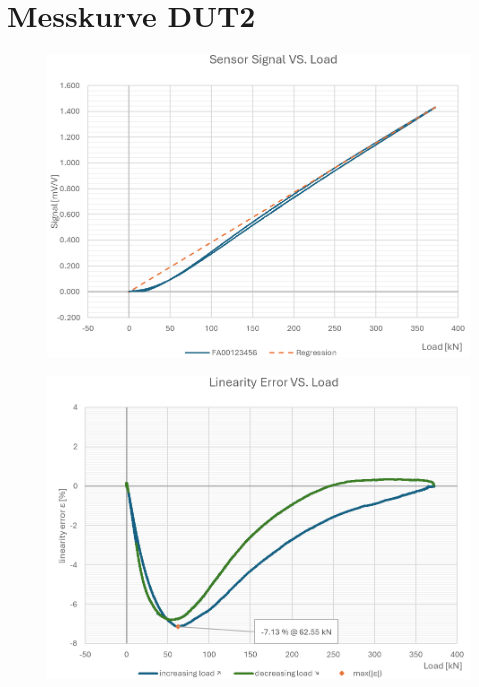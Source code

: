 \documentclass[12pt,a4paper]{article}
\begin{document}
	\section{Messkurve DUT2}
\begin{figure}[H]
	\centering
	\includegraphics[width=.8\linewidth]{img/screenshot003}
	\label{fig:screenshot003}
\end{figure}
\begin{figure}[H]
	\centering
	\includegraphics[width=.8\linewidth]{img/screenshot004}
	\label{fig:screenshot004}
\end{figure}
\end{document}
